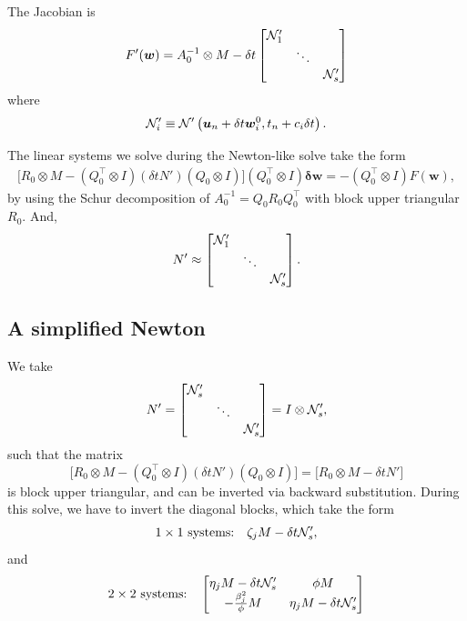 \documentclass[review]{siamart}
\begin{document}
The Jacobian is
\begin{align}
F'(\bm{w}) = A_0^{-1} \otimes M - 
\delta t
\begin{bmatrix} {\cal N}'_1 \\ 
& \ddots \\ 
& & {\cal N}'_s
\end{bmatrix}
\end{align}
where
\begin{align}
{\cal N}'_i \equiv {\cal N}' \left(\bm{u}_n + \delta t \bm{w}_i^0, t_n + c_i \delta t \right).
\end{align}

The linear systems we solve during the Newton-like solve take the form
\begin{align}
\big[ R_0 \otimes M - (Q_0^\top \otimes  I) (\delta t N')  (Q_0 \otimes I) \big] 
(Q_0^\top \otimes I) \bm{ \delta w } = - (Q_0^\top \otimes I) F( \bm{w}),
\end{align}
by using the Schur decomposition of $A^{-1}_0 = Q_0  R_0 Q^{\top}_0$ with block upper triangular $R_0$. And, 
\begin{align}
N' \approx  
\begin{bmatrix} {\cal N}'_1 \\ 
& \ddots \\ 
& & {\cal N}'_s
\end{bmatrix}.
\end{align}

\subsection{A simplified Newton}
We take
\begin{align}
N' = 
\begin{bmatrix} {\cal N}'_s \\ 
& \ddots \\ 
& & {\cal N}'_s
\end{bmatrix}
= 
I \otimes {\cal N}'_s,
\end{align}
such that the matrix 
\[\big[ R_0 \otimes M - (Q_0^\top \otimes  I) (\delta t N')  (Q_0 \otimes I) \big] = 
\big[ R_0 \otimes M - \delta t N' \big] \] is block upper triangular, and can be inverted via backward substitution. During this solve, we have to invert the diagonal blocks, which take the form
\begin{align}
1 \times 1 \textrm{ systems:} \quad \zeta_j M - \delta t {\cal N}'_s,
\end{align}
and 
\begin{align}
2 \times 2 \textrm{ systems:} \quad
\begin{bmatrix}
\eta_j M  - \delta t {\cal N}'_s & \phi M \\
-\tfrac{\beta^2_j}{\phi} M & \eta_j M  - \delta t {\cal N}'_s \\
\end{bmatrix}
\end{align}
\end{document}
